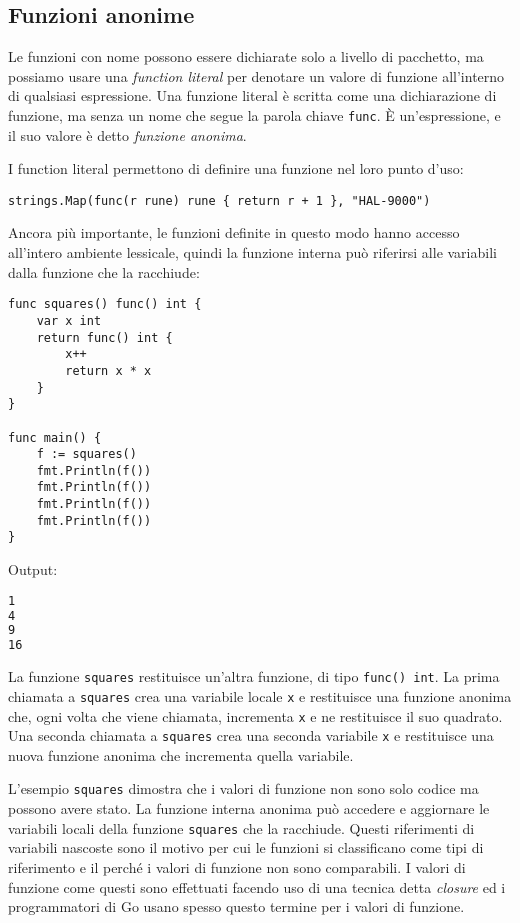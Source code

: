 \documentclass[../../thesis.tex]{subfiles}
\begin{document}
    \subsection{Funzioni anonime}\label{subsec:funzioni-anonime}
    Le funzioni con nome possono essere dichiarate solo a livello di pacchetto, ma possiamo usare una \textit{function literal} per denotare un valore di funzione all'interno di qualsiasi espressione.
    Una funzione literal è scritta come una dichiarazione di funzione, ma senza un nome che segue la parola chiave \verb"func".
    È un'espressione, e il suo valore è detto \textit{funzione anonima}.
    \hfill \vspace{12pt}

    I function literal permettono di definire una funzione nel loro punto d'uso:
    \begin{lstlisting}[frame = single,label={lst:lstlisting4-6.1}]
strings.Map(func(r rune) rune { return r + 1 }, "HAL-9000")
    \end{lstlisting}
    Ancora più importante, le funzioni definite in questo modo hanno accesso all'intero ambiente lessicale, quindi la funzione interna può riferirsi alle variabili dalla funzione che la racchiude:
    \begin{lstlisting}[frame = single,label={lst:lstlisting4-6.2}]
func squares() func() int {
    var x int
    return func() int {
        x++
        return x * x
    }
}

func main() {
    f := squares()
    fmt.Println(f())
    fmt.Println(f())
    fmt.Println(f())
    fmt.Println(f())
}
    \end{lstlisting}
    Output:
    \begin{lstlisting}[language = bash, frame = L,label={lst:lstlisting4-6.3}]
1
4
9
16
    \end{lstlisting}
    La funzione \verb"squares" restituisce un'altra funzione, di tipo \verb"func() int".
    La prima chiamata a \verb"squares" crea una variabile locale \verb"x" e restituisce una funzione anonima che, ogni volta che viene chiamata, incrementa \verb"x" e ne restituisce il suo quadrato.
    Una seconda chiamata a \verb"squares" crea una seconda variabile \verb"x" e restituisce una nuova funzione anonima che incrementa quella variabile.
    \hfill \vspace{12pt}

    L'esempio \verb"squares" dimostra che i valori di funzione non sono solo codice ma possono avere stato.
    La funzione interna anonima può accedere e aggiornare le variabili locali della funzione \verb"squares" che la racchiude.
    Questi riferimenti di variabili nascoste sono il motivo per cui le funzioni si classificano come tipi di riferimento e il perché i valori di funzione non sono comparabili.
    I valori di funzione come questi sono effettuati facendo uso di una tecnica detta \textit{closure} ed i programmatori di Go usano spesso questo termine per i valori di funzione.
    \hfill \vspace{12pt}
\end{document}
